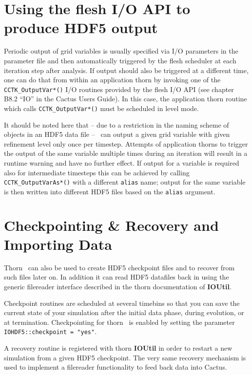 \documentclass{article}
\begin{document}
\section{Using the flesh I/O API to produce HDF5 output}

Periodic output of grid variables is usually specified via I/O parameters
in the parameter file and then automatically triggered by the flesh scheduler
at each iteration step after analysis. If output should also be triggered
at a different time, one can do that from within an application thorn by
invoking one of the {\tt CCTK\_OutputVar*()} I/O routines provided
by the flesh I/O API (see chapter B8.2 ``IO'' in the Cactus Users Guide).
In this case, the application thorn routine which calls {\tt CCTK\_OutputVar*()}
must be scheduled in level mode.

It should be noted here that -- due to a restriction in the naming scheme of
objects in an HDF5 data file -- \ThisThorn\ can output a given grid variable
with given refinement level only once per timestep. Attempts of application
thorns to trigger the output of the same variable multiple times during an iteration
will result in a runtime warning and have no further effect.
If output for a variable is required also for intermediate timesteps
this can be achieved by calling {\tt CCTK\_OutputVarAs*()} with a different
{\tt alias} name; output for the same variable is then written into
different HDF5 files based on the {\tt alias} argument.


\section{Checkpointing \& Recovery and Importing Data}

Thorn \ThisThorn\ can also be used to create HDF5 checkpoint files and
to recover from such files later on. In addition it can read HDF5 datafiles
back in using the generic filereader interface described in the thorn
documentation of {\bf IOUtil}.

Checkpoint routines are scheduled at several timebins so that you can save
the current state of your simulation after the initial data phase,
during evolution, or at termination. Checkpointing for thorn \ThisThorn\ 
is enabled by setting the parameter {\tt IOHDF5::checkpoint = "yes"}.

A recovery routine is registered with thorn {\bf IOUtil} in order to restart
a new simulation from a given HDF5 checkpoint.
The very same recovery mechanism is used to implement a filereader
functionality to feed back data into Cactus.
\end{document}
